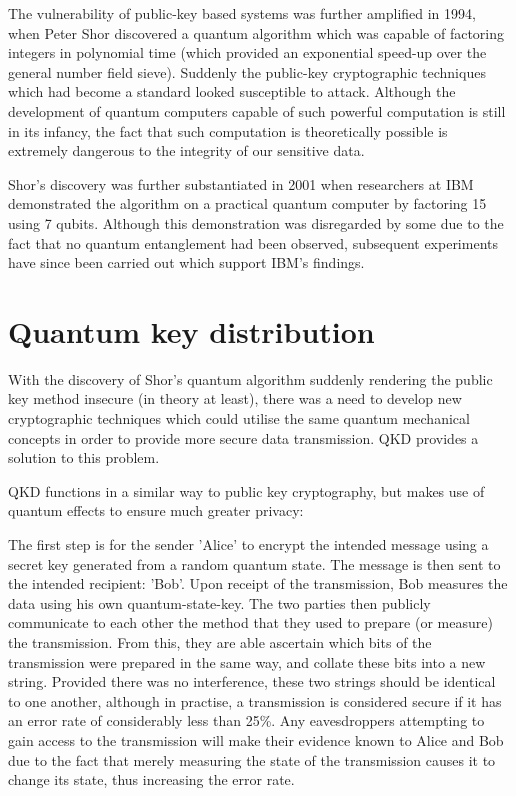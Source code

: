 \documentclass[runningheads,a4paper]{llncs}
\begin{document}
The vulnerability of public-key based systems was further amplified in 1994, when Peter Shor discovered a quantum algorithm which was capable of factoring integers in polynomial time\cite{Shor:1994fk} (which provided an exponential speed-up over the general number field sieve). Suddenly the public-key cryptographic techniques which had become a standard looked susceptible to attack. Although the development of quantum computers capable of such powerful computation is still in its infancy, the fact that such computation is theoretically possible is extremely dangerous to the integrity of our sensitive data.

Shor's discovery was further substantiated in 2001 when researchers at IBM demonstrated the algorithm on a practical quantum computer by factoring 15 using 7 qubits\cite{Vandersypen:2001fk}. Although this demonstration was disregarded by some due to the fact that no quantum entanglement had been observed, subsequent experiments have since been carried out which support IBM's findings\cite{Lu:2007uq}.

\section{Quantum key distribution}

With the discovery of Shor's quantum algorithm suddenly rendering the public key method insecure (in theory at least), there was a need to develop new cryptographic techniques which could utilise the same quantum mechanical concepts in order to provide more secure data transmission. QKD provides a solution to this problem.

QKD functions in a similar way to public key cryptography, but makes use of quantum effects to ensure much greater privacy:

The first step is for the sender 'Alice' to encrypt the intended message using a secret key generated from a random quantum state. The message is then sent to the intended recipient: 'Bob'. Upon receipt of the transmission, Bob measures the data using his own quantum-state-key. The two parties then publicly communicate to each other the method that they used to prepare (or measure) the transmission. From this, they are able ascertain which bits of the transmission were prepared in the same way, and collate these bits into a new string. Provided there was no interference, these two strings should be identical to one another, although in practise, a transmission is considered secure if it has an error rate of considerably less than 25\%\cite{Steane:1997zr}. Any eavesdroppers attempting to gain access to the transmission will make their evidence known to Alice and Bob due to the fact that merely measuring the state of the transmission causes it to change its state, thus increasing the error rate.
\end{document}
